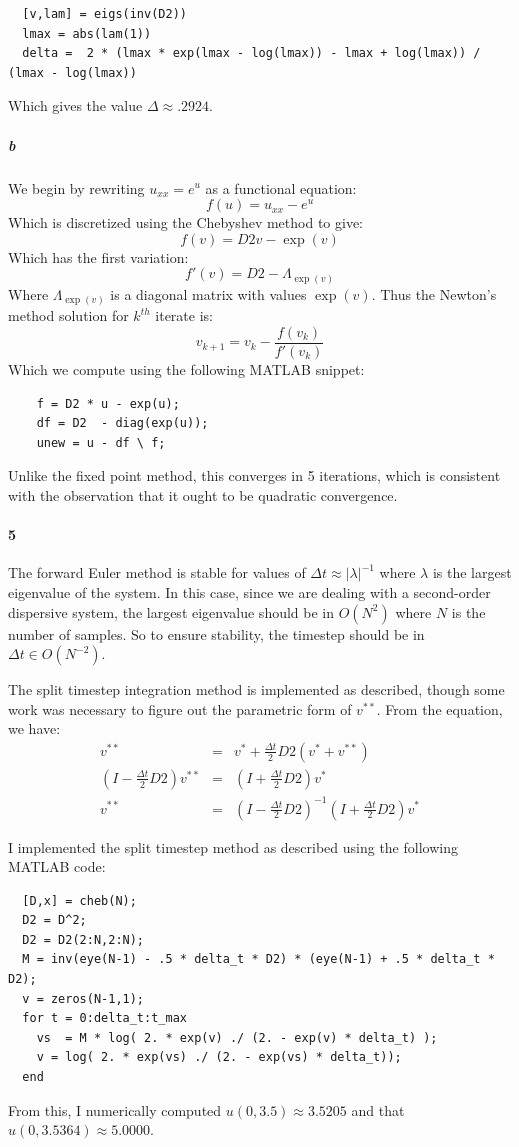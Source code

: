 \documentclass{article}
\begin{document}
\begin{verbatim}
  [v,lam] = eigs(inv(D2))
  lmax = abs(lam(1))
  delta =  2 * (lmax * exp(lmax - log(lmax)) - lmax + log(lmax)) / (lmax - log(lmax))
\end{verbatim}  

Which gives the value $\Delta \approx .2924$.

\subparagraph{b}

We begin by rewriting $u_{xx} = e^u$ as a functional equation:
\[ f(u) = u_{xx} - e^u \]
Which is discretized using the Chebyshev method to give:
\[ f(v) = D2 v - \exp(v) \]
Which has the first variation:
\[ f'(v) = D2 - \Lambda_{\exp(v)} \]
Where $\Lambda_{\exp(v)}$ is a diagonal matrix with values $\exp(v)$.  Thus the Newton's method solution for $k^{th}$ iterate is:
\[ v_{k+1} = v_{k} - \frac{f(v_k)}{f'(v_{k})} \]
Which we compute using the following MATLAB snippet:
\begin{verbatim}
    f = D2 * u - exp(u);
    df = D2  - diag(exp(u));
    unew = u - df \ f;
\end{verbatim}
Unlike the fixed point method, this converges in 5 iterations, which is consistent with the observation that it ought to be quadratic convergence.

\paragraph{5}

The forward Euler method is stable for values of $\Delta t \approx | \lambda |^{-1}$ where $\lambda$ is the largest eigenvalue of the system.  In this case, since we are dealing with a second-order dispersive system, the largest eigenvalue should be in $O(N^2)$ where $N$ is the number of samples.  So to ensure stability, the timestep should be in $\Delta t \in O(N^{-2})$.

The split timestep integration method is implemented as described, though some work was necessary to figure out the parametric form of $v^{**}$.  From the equation, we have:
\begin{eqnarray*}
v^{**} & = & v^* + \frac{\Delta t}{2} D2 ( v^{*} + v^{**} ) \\
(I - \frac{\Delta t}{2} D2) v^{**} & = & (I + \frac{\Delta t}{2} D2) v^* \\
v^{**} & = & (I - \frac{\Delta t}{2} D2)^{-1} (I + \frac{\Delta t}{2} D2) v^*
\end{eqnarray*}

I implemented the split timestep method as described using the following MATLAB code:

\begin{verbatim}
  [D,x] = cheb(N); 
  D2 = D^2; 
  D2 = D2(2:N,2:N);
  M = inv(eye(N-1) - .5 * delta_t * D2) * (eye(N-1) + .5 * delta_t * D2);
  v = zeros(N-1,1);
  for t = 0:delta_t:t_max
    vs  = M * log( 2. * exp(v) ./ (2. - exp(v) * delta_t) );
  	v = log( 2. * exp(vs) ./ (2. - exp(vs) * delta_t));
  end
\end{verbatim}

From this, I numerically computed $u(0, 3.5) \approx 3.5205$ and that $u(0, 3.5364) \approx 5.0000$.
\end{document}
